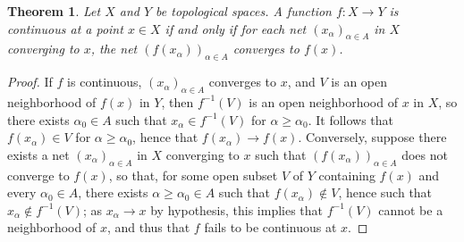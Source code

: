 \documentclass[12pt]{article}
\theoremstyle{plain}
\newtheorem*{thm*}{Theorem}
\begin{document}
\begin{thm*}
Let $X$ and $Y$ be topological spaces. A function $f:X\rightarrow Y$ is continuous at a point $x\in X$ if and only if for each net $(x_\alpha)_{\alpha\in A}$ in $X$ converging to $x$, the net $(f(x_\alpha))_{\alpha\in A}$ converges to $f(x)$.
\end{thm*}
\begin{proof}
If $f$ is continuous, $(x_\alpha)_{\alpha\in A}$ converges to $x$, and $V$ is an open neighborhood of $f(x)$ in $Y$, then $f^{-1}(V)$ is an open neighborhood of $x$ in $X$, so there exists $\alpha_0\in A$ such that $x_\alpha\in f^{-1}(V)$ for $\alpha\geq\alpha_0$. It follows that $f(x_\alpha)\in V$ for $\alpha\geq\alpha_0$, hence that $f(x_\alpha)\rightarrow f(x)$. Conversely, suppose there exists a net $(x_\alpha)_{\alpha\in A}$ in $X$ converging to $x$ such that $(f(x_\alpha))_{\alpha\in A}$ does not converge to $f(x)$, so that, for some open subset $V$ of $Y$ containing $f(x)$ and every $\alpha_0\in A$, there exists $\alpha\geq\alpha_0\in A$ such that $f(x_{\alpha})\notin V$, hence such that $x_\alpha\notin f^{-1}(V)$; as $x_\alpha\rightarrow x$ by hypothesis, this implies that $f^{-1}(V)$ cannot be a neighborhood of $x$, and thus that $f$ fails to be continuous at $x$.
\end{proof}
\end{document}
